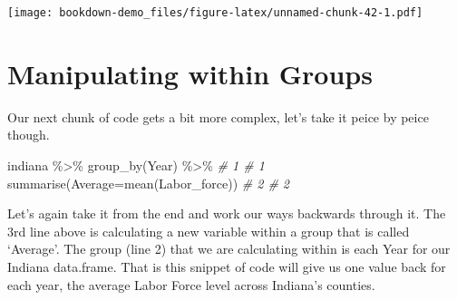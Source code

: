 \documentclass[
]{book}
\newenvironment{Shaded}{\begin{snugshade}}{\end{snugshade}}
\newcommand{\AttributeTok}[1]{\textcolor[rgb]{0.77,0.63,0.00}{#1}}
\newcommand{\CommentTok}[1]{\textcolor[rgb]{0.56,0.35,0.01}{\textit{#1}}}
\newcommand{\FunctionTok}[1]{\textcolor[rgb]{0.00,0.00,0.00}{#1}}
\newcommand{\NormalTok}[1]{#1}
\newcommand{\SpecialCharTok}[1]{\textcolor[rgb]{0.00,0.00,0.00}{#1}}
\begin{document}
\texttt{[image: bookdown-demo\_files/figure-latex/unnamed-chunk-42-1.pdf]}

\hypertarget{manipulating-within-groups}{%
\section{Manipulating within Groups}\label{manipulating-within-groups}}

Our next chunk of code gets a bit more complex, let's take it peice by peice though.

\begin{Shaded}
\begin{Highlighting}[]
\NormalTok{  indiana }\SpecialCharTok{\%\textgreater{}\%} \FunctionTok{group\_by}\NormalTok{(Year) }\SpecialCharTok{\%\textgreater{}\%}          \CommentTok{\# 1  \# 1}
    \FunctionTok{summarise}\NormalTok{(}\AttributeTok{Average=}\FunctionTok{mean}\NormalTok{(Labor\_force))  }\CommentTok{\# 2  \# 2}
\end{Highlighting}
\end{Shaded}

Let's again take it from the end and work our ways backwards through it. The 3rd line above is calculating a new variable within a group that is called `Average'. The group (line 2) that we are calculating within is each Year for our Indiana data.frame. That is this snippet of code will give us one value back for each year, the average Labor Force level across Indiana's counties.
\end{document}

